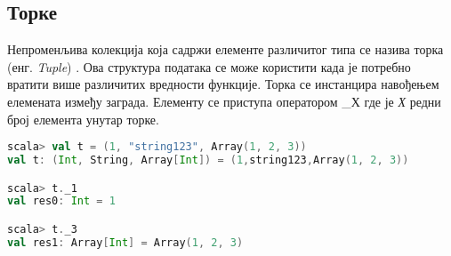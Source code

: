 \documentclass[12pt,oneside]{memoir}
\begin{document}
%
%
%


%



\subsection{Торке}
\label{subsec:scala_tuple}

Непроменљива колекција која садржи елементе различитог типа се назива торка (енг. \textit{Tuple}) \cite{scala_prog}. Ова структура података се може користити када је потребно вратити више различитих вредности функције. Торка се инстанцира навођењем елемената између заграда. Елементу се приступа оператором \_Х где је \textit{Х} редни број елемента унутар торке.

\begin{lstlisting}[language=Scala, caption={Пример торке у Скали}, label={lst:scala_coll_tuple_example}, basicstyle=\small]
scala> val t = (1, "string123", Array(1, 2, 3))
val t: (Int, String, Array[Int]) = (1,string123,Array(1, 2, 3))

scala> t._1
val res0: Int = 1

scala> t._3
val res1: Array[Int] = Array(1, 2, 3)
\end{lstlisting}
\end{document}
